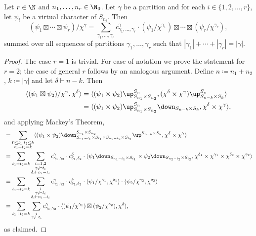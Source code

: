 \begin{lemma}\label{lem:16.2}
	Let $r\in\N$ and $n_1,\dotsc,n_r\in\N_0$. Let $\gamma$ be a partition and for each $i\in\{1,2,\dotsc,r\}$, let $\psi_i$ be a virtual character of $S_{n_i}$. Then
	\[ (\psi_1\boxtimes\cdots\boxtimes\psi_r)/\chi^\gamma = \sum_{\gamma_1,\dotsc,\gamma_r} c^\gamma_{\gamma_1,\dotsc,\gamma_r}\cdot (\psi_1/\chi^{\gamma_1})\boxtimes\cdots\boxtimes(\psi_r/\chi^{\gamma_r}), \]
	summed over all sequences of partitions $\gamma_1,\dotsc,\gamma_r$ such that $|\gamma_1|+\cdots+|\gamma_r|=|\gamma|$.
\end{lemma}

\begin{proof}
	The case $r=1$ is trivial. For ease of notation we prove the statement for $r=2$; the case of general $r$ follows by an analogous argument. Define $n\coloneqq n_1+n_2$, $k\coloneqq |\gamma|$ and let $\delta\vdash n-k$. Then
	\begin{align*}
		\langle (\psi_1\boxtimes\psi_2)/\chi^\gamma,\chi^\delta\rangle &= \langle (\psi_1\times\psi_2)\up_{S_{n_1}\times S_{n_2}}^{S_n}, (\chi^\delta\times\chi^\gamma)\up_{S_{n-k}\times S_k}^{S_n}\rangle\\
		&= \langle (\psi_1\times\psi_2)\up_{S_{n_1}\times S_{n_2}}^{S_n}\down_{S_{n-k}\times S_k}, \chi^\delta\times\chi^\gamma\rangle,
	\end{align*}
	and applying Mackey's Theorem,
	\footnotesize
	\begin{align*}
		&= \sum_{\substack{0\le t_1,t_2\le k\\ t_1+t_2=k}} \langle (\psi_1\times\psi_2)\down^{S_{n_1}\times S_{n_2}}_{S_{n_1-t_1}\times S_{t_1}\times S_{n_2-t_2}\times S_{t_2}}\up^{S_{n-k}\times S_{k}}, \chi^\delta\times\chi^\gamma\rangle\\
		&= \sum_{t_1+t_2=k} \sum_{\substack{i=1,2\\\gamma_i\vdash t_i\\\delta_i\vdash n_i-t_i}} c^\gamma_{\gamma_1,\gamma_2}\cdot c^\delta_{\delta_1,\delta_2}\cdot \langle \psi_1\down_{S_{n_1-t_1}\times S_{t_1}} \times \psi_2\down_{S_{n_2-t_2}\times S_{t_2}}, \chi^{\delta_1}\times\chi^{\gamma_1}\times\chi^{\delta_2}\times\chi^{\gamma_2}\rangle\\
		&= \sum_{t_1+t_2=k} \sum_{\substack{i\\\gamma_i\vdash t_i\\\delta_i\vdash n_i-t_i}} c^\gamma_{\gamma_1,\gamma_2}\cdot c^\delta_{\delta_1,\delta_2}\cdot \langle \psi_1/\chi^{\gamma_1},\chi^{\delta_1}\rangle\cdot\langle \psi_2/\chi^{\gamma_2},\chi^{\delta_2}\rangle\\
		&= \sum_{t_1+t_2=k} \sum_{\substack{i\\\gamma_i\vdash t_i}} c^\gamma_{\gamma_1,\gamma_2}\cdot \langle (\psi_1/\chi^{\gamma_1})\boxtimes(\psi_2/\chi^{\gamma_2}), \chi^\delta\rangle,
	\end{align*}
	\normalsize
	as claimed.
\end{proof}

